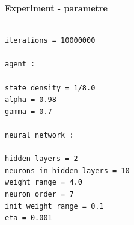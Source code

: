 \documentclass[xcolor=dvipsnames]{beamer}
\begin{document}
\fi

\begin{frame}[fragile]{\bf Experiment - parametre}

\begin{lstlisting}

iterations = 10000000

agent :

state_density = 1/8.0
alpha = 0.98
gamma = 0.7

neural network :

hidden layers = 2
neurons in hidden layers = 10
weight range = 4.0
neuron order = 7
init weight range = 0.1
eta = 0.001

\end{lstlisting}

\end{frame}
\end{document}
